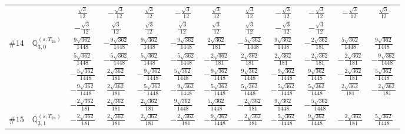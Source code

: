 \documentclass[fleqn,9pt,landscape]{jsarticle}
\begin{document}
\begin{center}
\begin{longtable}{lcccccccccc}
& $ \frac{\sqrt{3}}{12} $ & $ - \frac{\sqrt{3}}{12} $ & $ \frac{\sqrt{3}}{12} $ & $ - \frac{\sqrt{3}}{12} $ & $ \frac{\sqrt{3}}{12} $ & $ \frac{\sqrt{3}}{12} $ & $ - \frac{\sqrt{3}}{12} $ & $ - \frac{\sqrt{3}}{12} $ & $ - \frac{\sqrt{3}}{12} $ & $ \frac{\sqrt{3}}{12} $ \\
& $ - \frac{\sqrt{3}}{12} $ & $ \frac{\sqrt{3}}{12} $ & $ \frac{\sqrt{3}}{12} $ & $ \frac{\sqrt{3}}{12} $ & $ \frac{\sqrt{3}}{12} $ & $ \frac{\sqrt{3}}{12} $ & $ - \frac{\sqrt{3}}{12} $ & $ - \frac{\sqrt{3}}{12} $ & $  $ & $  $ \\ \hline
$ \#14\quad \mathbb{Q}_{3,0}^{(s,T_{2u})} $ & $ \frac{9 \sqrt{362}}{1448} $ & $ - \frac{9 \sqrt{362}}{1448} $ & $ \frac{9 \sqrt{362}}{1448} $ & $ - \frac{9 \sqrt{362}}{1448} $ & $ \frac{2 \sqrt{362}}{181} $ & $ - \frac{5 \sqrt{362}}{1448} $ & $ \frac{9 \sqrt{362}}{1448} $ & $ - \frac{2 \sqrt{362}}{181} $ & $ \frac{5 \sqrt{362}}{1448} $ & $ \frac{9 \sqrt{362}}{1448} $ \\
& $ \frac{5 \sqrt{362}}{1448} $ & $ - \frac{5 \sqrt{362}}{1448} $ & $ \frac{5 \sqrt{362}}{1448} $ & $ - \frac{5 \sqrt{362}}{1448} $ & $ - \frac{2 \sqrt{362}}{181} $ & $ \frac{2 \sqrt{362}}{181} $ & $ \frac{2 \sqrt{362}}{181} $ & $ - \frac{2 \sqrt{362}}{181} $ & $ - \frac{2 \sqrt{362}}{181} $ & $ - \frac{9 \sqrt{362}}{1448} $ \\
& $ - \frac{5 \sqrt{362}}{1448} $ & $ \frac{2 \sqrt{362}}{181} $ & $ - \frac{9 \sqrt{362}}{1448} $ & $ \frac{5 \sqrt{362}}{1448} $ & $ - \frac{9 \sqrt{362}}{1448} $ & $ \frac{9 \sqrt{362}}{1448} $ & $ - \frac{9 \sqrt{362}}{1448} $ & $ \frac{9 \sqrt{362}}{1448} $ & $ - \frac{2 \sqrt{362}}{181} $ & $ \frac{5 \sqrt{362}}{1448} $ \\
& $ - \frac{9 \sqrt{362}}{1448} $ & $ \frac{2 \sqrt{362}}{181} $ & $ - \frac{5 \sqrt{362}}{1448} $ & $ - \frac{9 \sqrt{362}}{1448} $ & $ - \frac{5 \sqrt{362}}{1448} $ & $ \frac{5 \sqrt{362}}{1448} $ & $ - \frac{5 \sqrt{362}}{1448} $ & $ \frac{5 \sqrt{362}}{1448} $ & $ \frac{2 \sqrt{362}}{181} $ & $ - \frac{2 \sqrt{362}}{181} $ \\
& $ - \frac{2 \sqrt{362}}{181} $ & $ \frac{2 \sqrt{362}}{181} $ & $ \frac{2 \sqrt{362}}{181} $ & $ \frac{9 \sqrt{362}}{1448} $ & $ \frac{5 \sqrt{362}}{1448} $ & $ - \frac{2 \sqrt{362}}{181} $ & $ \frac{9 \sqrt{362}}{1448} $ & $ - \frac{5 \sqrt{362}}{1448} $ & $  $ & $  $ \\ \hline
$ \#15\quad \mathbb{Q}_{3,1}^{(s,T_{2u})} $ & $ - \frac{2 \sqrt{362}}{181} $ & $ \frac{2 \sqrt{362}}{181} $ & $ \frac{2 \sqrt{362}}{181} $ & $ - \frac{2 \sqrt{362}}{181} $ & $ - \frac{9 \sqrt{362}}{1448} $ & $ - \frac{2 \sqrt{362}}{181} $ & $ - \frac{5 \sqrt{362}}{1448} $ & $ \frac{9 \sqrt{362}}{1448} $ & $ - \frac{2 \sqrt{362}}{181} $ & $ \frac{5 \sqrt{362}}{1448} $ \\

\end{longtable}
\end{center}
\end{document}
